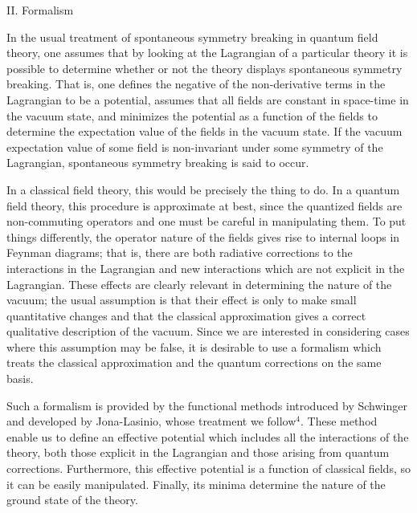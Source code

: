 \documentclass[12pt,epsf]{report}
\begin{document}
\vfill \eject

\centerline{II. Formalism}

\bigskip

In the usual treatment of spontaneous symmetry breaking in quantum
field theory, one assumes that by looking at the Lagrangian of a
particular theory it is possible to determine whether or not the
theory displays spontaneous symmetry breaking.  That is, one defines
the negative of the non-derivative terms in the Lagrangian to be a
potential, assumes that all fields are constant in space-time in the
vacuum state, and minimizes the potential as a function of the fields
to determine the expectation value of the fields in the vacuum state.
If the vacuum expectation value of some field is non-invariant under
some symmetry of the Lagrangian, spontaneous symmetry breaking is said
to occur.

In a classical field theory, this would be precisely the thing to do.  In
a quantum field theory, this procedure is approximate at best, since the
quantized fields are non-commuting operators and one must be careful in 
manipulating them.  To put things differently, the operator nature of the
fields gives rise to internal loops in Feynman diagrams; that is, there are
both radiative corrections to the interactions in the Lagrangian and new
interactions which are not explicit in the Lagrangian.  These effects are
clearly relevant in determining the nature of the vacuum; the usual 
assumption is that their effect is only to make small quantitative
changes and that the classical approximation gives a correct qualitative
description of the vacuum.  Since we are interested in considering cases
where this assumption may be false, it is desirable to use a formalism 
which treats the classical approximation and the quantum corrections on 
the same basis.

Such a formalism is provided by the functional methods introduced by
Schwinger and developed by Jona-Lasinio, whose treatment we
follow$^4$.  These method enable us to define an effective potential
which includes all the interactions of the theory, both those explicit
in the Lagrangian and those arising from quantum corrections.  
Furthermore, this effective potential is a function of classical fields, 
so it can be easily manipulated.  Finally, its minima determine the 
nature of the ground state of the theory.
\end{document}
